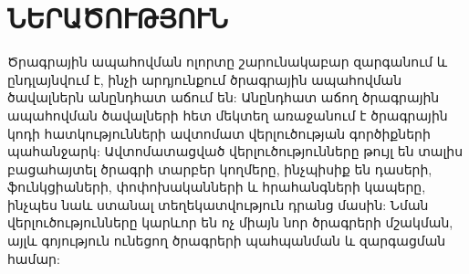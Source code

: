 {
    \section*{\textbf{ՆԵՐԱԾՈՒԹՅՈՒՆ}}\label{sec:introduction}
    Ծրագրային ապահովման ոլորտը շարունակաբար զարգանում և ընդլայնվում է, ինչի արդյունքում ծրագրային ապահովման ծավալներն
    անընդհատ աճում են: Անընդհատ աճող ծրագրային ապահովման ծավալների հետ մեկտեղ առաջանում է ծրագրային կոդի հատկությունների
    ավտոմատ վերլուծության գործիքների պահանջարկ: Ավտոմատացված վերլուծությունները թույլ են տալիս բացահայտել ծրագրի տարբեր
    կողմերը, ինչպիսիք են դասերի, ֆունկցիաների, փոփոխականների և հրահանգների կապերը, ինչպես նաև ստանալ տեղեկատվություն
    դրանց մասին: Նման վերլուծությունները կարևոր են ոչ միայն նոր ծրագրերի մշակման, այլև գոյություն ունեցող ծրագրերի
    պահպանման և զարգացման համար:
}